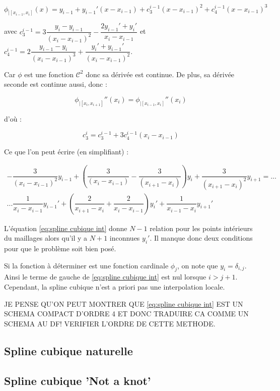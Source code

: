 \begin{equation}
\phi_{|[x_{i-1}, x_{i}]} (x) = y_{i-1} + y_{i-1}' (x-x_{i-1}) + c_3^{i-1} (x-x_{i-1})^2 + c_4^{i-1} (x-x_{i-1})^3
\end{equation}

avec $c_3^{i-1} = 3 \dfrac{y_i - y_{i-1}}{(x_{i}-x_{i-1})^2} - \dfrac{2 y_{i-1}' + y_{i}'}{x_{i}-x_{i-1}}$ et 
$c_4^{i-1} = 2 \dfrac{y_{i-1} - y_i}{(x_{i}-x_{i-1})^3} + \dfrac{y_{i}' + y_{i-1}'}{(x_{i}-x_{i-1})^2}$.

Car $\phi$ est une fonction $\mathcal{C}^2$ donc sa dérivée est continue. De plus, sa dérivée seconde est continue aussi, donc :

\begin{equation}
\phi_{|[x_i, x_{i+1}]}''(x_i) = \phi_{|[x_{i-1}, x_{i}]}''(x_i) 
\end{equation}

d'où :

\begin{equation}
c_3^i = c_3^{i-1} + 3 c_4^{i-1} ( x_i - x_{i-1} )
\end{equation}

Ce que l'on peut écrire (en simplifiant) :

\begin{multline}
- \dfrac{3}{(x_i - x_{i-1})^2} y_{i-1} + \left( \dfrac{3}{(x_i - x_{i-1})} - \dfrac{3}{(x_{i+1} - x_{i})} \right) y_i + \dfrac{3}{(x_{i+1} - x_{i})^2} y_{i+1} = ...\\
... \dfrac{1}{x_i - x_{i-1}} y_{i-1}' + \left( \dfrac{2}{x_{i+1}-x_i} + \dfrac{2}{x_{i}-x_{i-1}} \right)y_i' + \dfrac{1}{x_{i-1} - x_{i}} y_{i+1}' 
\label{eq:spline cubique int}
\end{multline}

L'équation \eqref{eq:spline cubique int} donne $N-1$ relation pour les points intérieurs du maillages alors qu'il y a $N+1$ inconnues $y_i'$. Il manque donc deux conditions pour que le problème soit bien posé.

Si la fonction à déterminer est une fonction cardinale $\phi_j$, on note que $y_i = \delta_{i,j}$. Ainsi le terme de gauche de \eqref{eq:spline cubique int} est nul lorsque $i>j+1$. Cependant, la spline cubique n'est a priori pas une interpolation locale.

JE PENSE QU'ON PEUT MONTRER QUE \eqref{eq:spline cubique int} EST UN SCHEMA COMPACT D'ORDRE 4 ET DONC TRADUIRE CA COMME UN SCHEMA AU DF! VERIFIER L'ORDRE DE CETTE METHODE.

\subsection{Spline cubique naturelle}

\subsection{Spline cubique 'Not a knot'}













